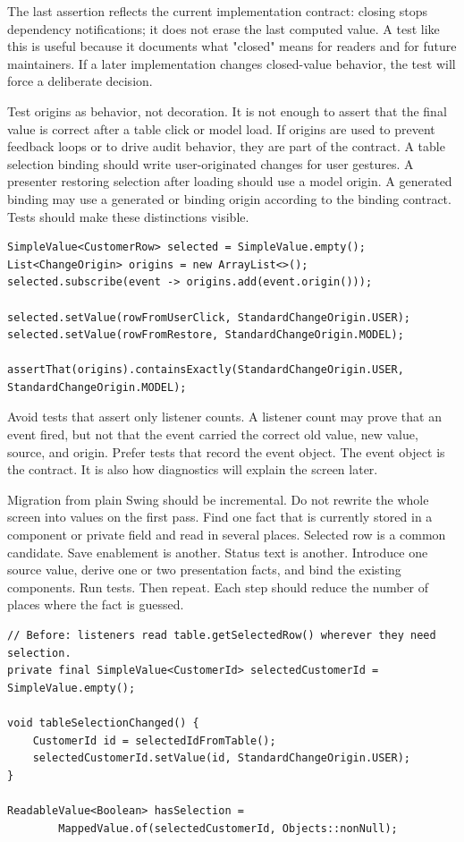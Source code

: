The last assertion reflects the current implementation contract: closing stops
dependency notifications; it does not erase the last computed value. A test like
this is useful because it documents what "closed" means for readers and for
future maintainers. If a later implementation changes closed-value behavior, the
test will force a deliberate decision.

Test origins as behavior, not decoration. It is not enough to assert that the
final value is correct after a table click or model load. If origins are used to
prevent feedback loops or to drive audit behavior, they are part of the
contract. A table selection binding should write user-originated changes for
user gestures. A presenter restoring selection after loading should use a model
origin. A generated binding may use a generated or binding origin according to
the binding contract. Tests should make these distinctions visible.

\begin{lstlisting}[caption={Recording origins as part of the rule.}]
SimpleValue<CustomerRow> selected = SimpleValue.empty();
List<ChangeOrigin> origins = new ArrayList<>();
selected.subscribe(event -> origins.add(event.origin()));

selected.setValue(rowFromUserClick, StandardChangeOrigin.USER);
selected.setValue(rowFromRestore, StandardChangeOrigin.MODEL);

assertThat(origins).containsExactly(StandardChangeOrigin.USER, StandardChangeOrigin.MODEL);
\end{lstlisting}

Avoid tests that assert only listener counts. A listener count may prove that an
event fired, but not that the event carried the correct old value, new value,
source, and origin. Prefer tests that record the event object. The event object
is the contract. It is also how diagnostics will explain the screen later.

Migration from plain Swing should be incremental. Do not rewrite the whole
screen into values on the first pass. Find one fact that is currently stored in
a component or private field and read in several places. Selected row is a common
candidate. Save enablement is another. Status text is another. Introduce one
source value, derive one or two presentation facts, and bind the existing
components. Run tests. Then repeat. Each step should reduce the number of places
where the fact is guessed.

\begin{lstlisting}[caption={The first migration step names selected identity.}]
// Before: listeners read table.getSelectedRow() wherever they need selection.
private final SimpleValue<CustomerId> selectedCustomerId = SimpleValue.empty();

void tableSelectionChanged() {
    CustomerId id = selectedIdFromTable();
    selectedCustomerId.setValue(id, StandardChangeOrigin.USER);
}

ReadableValue<Boolean> hasSelection =
        MappedValue.of(selectedCustomerId, Objects::nonNull);
\end{lstlisting}

